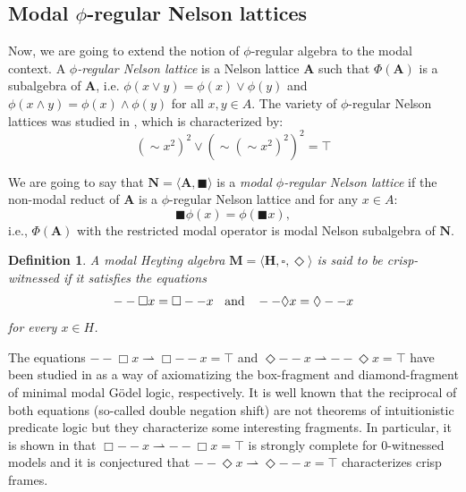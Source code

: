 \documentclass[pdflatex,sn-mathphys-num]{sn-jnl}%
\newcommand{\A}{\mathbf{A}}
\newcommand{\He}{\mathbf{H}}
\theoremstyle{thmstyleone}%
\theoremstyle{thmstyletwo}%
\theoremstyle{thmstylethree}%
\newtheorem{definition}{Definition}%
\begin{document}
\subsection{Modal \texorpdfstring{$\phi$}{phi}-regular Nelson lattices}

Now, we are going to extend the notion of $\phi$-regular algebra to the modal context. A \emph{$\phi$-regular Nelson lattice} is a Nelson lattice $\A$ such that $\Phi(\A)$ is a subalgebra of $\A$, i.e.
$\phi(x \vee y)=\phi(x)\vee \phi(y)$ and $\phi(x\wedge y)=\phi(x)\wedge \phi(y)$ for all $x,y \in A$. The variety of $\phi$-regular Nelson lattices was studied in \cite{Busaniche}, which is characterized by:
\begin{equation}
    (\sim x^2)^2 \vee (\sim (\sim x^2)^2)^2 = \top
\end{equation}

We are going to say that $\mathbf{N}=\langle\A,\blacksquare\rangle$ is a \emph{modal $\phi$-regular Nelson lattice} if the non-modal reduct of $\A$ is a $\phi$-regular Nelson lattice and for any $x \in A$:
$$\blacksquare \phi(x) = \phi (\blacksquare x),$$ 
i.e., $\Phi(\A)$ with the restricted modal operator is modal Nelson subalgebra of $\mathbf{N}$.

\begin{definition} \label{crisp-wit}
A modal Heyting algebra $\mathbf{M}=\langle \He,\square,\Diamond\rangle$ is said to be \textit{crisp-witnessed} if it satisfies the equations
\begin{equation} \label{modaldoblenegation}
 --\Box x = \Box --x \hspace{2mm} \mbox{ and } \hspace{2mm} --\Diamond x = \Diamond --x   \\
\end{equation}
for every $x \in H$.
\end{definition}


The equations $--\Box x \rightharpoonup \Box --x = \top$ and $\Diamond --x \rightharpoonup  --\Diamond x = \top$  have been studied in \cite{CaiRod2010} as a way of axiomatizing the box-fragment and diamond-fragment of minimal modal G\"odel logic, respectively. It is well known that the reciprocal of both equations (so-called double negation shift) are not theorems of intuitionistic predicate logic but they characterize some interesting fragments. In particular, it is shown in \cite{CaiRod2010} that $\Box --x \rightharpoonup --\Box x = \top$ is strongly complete for 0-witnessed models and it is conjectured that $--\Diamond x \rightharpoonup  \Diamond --x= \top$ characterizes crisp frames.
\end{document}
